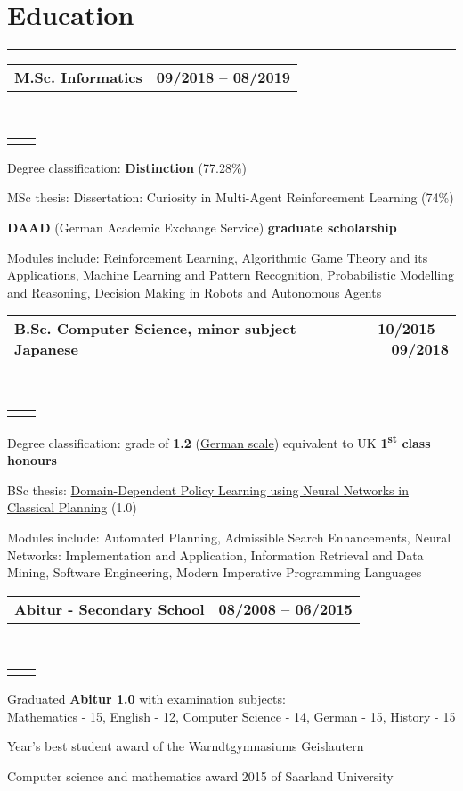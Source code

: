 \documentclass[]{deedy-resume}
\makeatletter
\newcommand{\headerrow}[2]
{\begin{tabular*}{\linewidth}{l@{\extracolsep{\fill}}r}
	\fontspec{Helvetica}\fontsize{12pt}{12pt}\selectfont\bfseries{\color{subheadings}#1} &
	\fontspec{Helvetica}\fontsize{12pt}{12pt}\selectfont\bfseries{\color{subheadings}#2} \\
\end{tabular*}}
\newcommand{\locationrow}[2]
{\begin{tabular*}{\linewidth}{l@{\extracolsep{\fill}}r}
        \color{headings}\scshape\fontspec{Heiti TC Medium}\fontsize{10pt}{12pt}\selectfont{#1}  &
        \color{headings}\scshape\fontspec{Heiti TC Medium}\fontsize{10pt}{12pt}\selectfont{#2}  \\
\end{tabular*}}
\makeatother
\begin{document}
\section*{Education}
\hrule
\vspace{0.4em}

\noindent
\headerrow{M.Sc. Informatics}{09/2018 -- 08/2019}
\\
\locationrow{University of Edinburgh}{Edinburgh, United Kingdom}
\begin{tightitemize}{1.7em}
    \item Degree classification: \textbf{Distinction} (77.28\%)
    \item MSc thesis: Dissertation: Curiosity in Multi-Agent Reinforcement Learning (74\%)
    \item \textbf{DAAD} (German Academic Exchange Service) \textbf{graduate scholarship}
    \item Modules include: Reinforcement Learning, Algorithmic Game Theory and its Applications, Machine Learning and 
    Pattern Recognition, Probabilistic Modelling and Reasoning, Decision Making in Robots and Autonomous Agents
\end{tightitemize}
\largesectionsep

\noindent
\headerrow{B.Sc. Computer Science, minor subject Japanese}{10/2015 -- 09/2018}
\\
\locationrow{Saarland University}{Saarbrücken, Germany}
\begin{tightitemize}{1.7em}
    \item Degree classification: grade of \textbf{1.2} (\href{https://en.wikipedia.org/wiki/Academic_grading_in_Germany}{German scale}) equivalent to UK \textbf{1\textsuperscript{st} class honours}
    \item BSc thesis: \href{https://www.lukaschaefer.de/assets/files/thesis.pdf}{Domain-Dependent Policy Learning using Neural Networks in Classical Planning} (1.0)
    \item Modules include: Automated Planning, Admissible Search Enhancements, Neural Networks: Implementation and Application, Information Retrieval and Data Mining, Software Engineering, Modern Imperative Programming Languages
\end{tightitemize}
\largesectionsep

\noindent
\headerrow{Abitur - Secondary School}{08/2008 -- 06/2015}
\\
\locationrow{Warndtgymnasium Geislautern, Völklingen}{Geislautern, Germany}
\begin{tightitemize}{1.7em}
    \item Graduated \textbf{Abitur 1.0} with examination subjects:\\
    Mathematics - 15, English - 12, Computer Science - 14, German - 15, History - 15
    \item Year's best student award of the Warndtgymnasiums Geislautern
    \item Computer science and mathematics award 2015 of Saarland University
\end{tightitemize}
\largesectionsep
\end{document}
